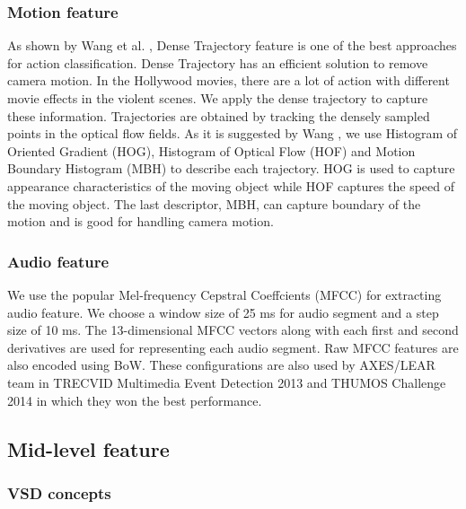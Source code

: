 \documentclass[twocolumn]{bmcart}%
\begin{document}
\subsubsection{Motion feature}
As shown by Wang et al. \cite{wang2013action}, Dense Trajectory feature is one of the best approaches for action classification. Dense Trajectory has an efficient solution to remove camera motion. In the Hollywood movies, there are a lot of action with different movie effects in the violent scenes. We apply the dense trajectory to capture these information. Trajectories are obtained by tracking the densely sampled points in the optical flow fields. As it is suggested by Wang \cite{wang2013action}, we use Histogram of Oriented Gradient (HOG), Histogram of Optical Flow (HOF) and Motion Boundary Histogram (MBH) to describe each trajectory. HOG is used to capture appearance characteristics of the moving object while HOF captures the speed of the moving object. The last descriptor, MBH, can capture boundary of the motion and is good for handling camera motion.

\subsubsection{Audio feature}
We use the popular Mel-frequency Cepstral Coeffcients (MFCC) \cite{rabiner2007introduction} for extracting audio feature. We choose a window size of 25 ms for audio segment and a step size of 10 ms. The 13-dimensional MFCC vectors along with each first and second derivatives are used for representing each audio segment. Raw MFCC features are also encoded using BoW. These configurations are also used by AXES/LEAR team in TRECVID Multimedia Event Detection 2013 \cite{aly2013axes} and THUMOS Challenge 2014 \cite{oneata2014lear} in which they won the best performance.

\subsection{Mid-level feature}
\subsubsection{VSD concepts}
\end{document}
